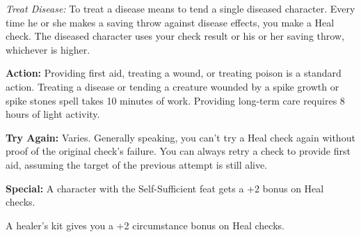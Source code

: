 \textit{Treat Disease:} To treat a disease means to tend a single diseased character. Every time he or she makes a saving throw against disease effects, you make a Heal check. The diseased character uses your check result or his or her saving throw, whichever is higher.

\textbf{Action:} Providing first aid, treating a wound, or treating poison is a standard action. Treating a disease or tending a creature wounded by a spike growth or spike stones spell takes 10 minutes of work. Providing long-term care requires 8 hours of light activity.

\textbf{Try Again:} Varies. Generally speaking, you can’t try a Heal check again without proof of the original check’s failure. You can always retry a check to provide first aid, assuming the target of the previous attempt is still alive.

\textbf{Special:} A character with the Self-Sufficient feat gets a +2 bonus on Heal checks.

A healer’s kit gives you a +2 circumstance bonus on Heal checks.